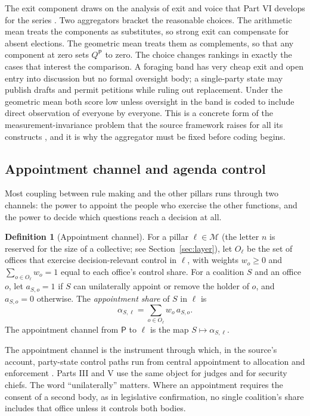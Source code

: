 \documentclass[11pt,letterpaper]{article}
\theoremstyle{definition}
\newtheorem{definition}[theorem]{Definition}
\theoremstyle{remark}
\newcommand{\pP}{\mathsf{P}}
\newcommand{\Mset}{\mathcal{M}}
\begin{document}
The exit component draws on the analysis of exit and voice that Part VI develops for the series \citep{long2026productive}. Two aggregators bracket the reasonable choices. The arithmetic mean treats the components as substitutes, so strong exit can compensate for absent elections. The geometric mean treats them as complements, so that any component at zero sets $Q^{\pP}$ to zero. The choice changes rankings in exactly the cases that interest the comparison. A foraging band has very cheap exit and open entry into discussion but no formal oversight body; a single-party state may publish drafts and permit petitions while ruling out replacement. Under the geometric mean both score low unless oversight in the band is coded to include direct observation of everyone by everyone. This is a concrete form of the measurement-invariance problem that the source framework raises for all its constructs \citep{largo2026hbs}, and it is why the aggregator must be fixed before coding begins.

\subsection{Appointment channel and agenda control}

Most coupling between rule making and the other pillars runs through two channels: the power to appoint the people who exercise the other functions, and the power to decide which questions reach a decision at all.

\begin{definition}[Appointment channel]
\label{def:political-power:appointment-channel}
For a pillar $\ell\in\Mset$ (the letter $n$ is reserved for the size of a collective; see Section~\ref{sec:layer}), let $O_\ell$ be the set of offices that exercise decision-relevant control in $\ell$, with weights $w_o\ge0$ and $\sum_{o\in O_\ell}w_o=1$ equal to each office's control share. For a coalition $S$ and an office $o$, let $a_{S,o}=1$ if $S$ can unilaterally appoint or remove the holder of $o$, and $a_{S,o}=0$ otherwise. The \emph{appointment share} of $S$ in $\ell$ is
\[
\alpha_{S,\ell}=\sum_{o\in O_\ell}w_o\,a_{S,o}.
\]
The appointment channel from $\pP$ to $\ell$ is the map $S\mapsto\alpha_{S,\ell}$.
\end{definition}

The appointment channel is the instrument through which, in the source's account, party-state control paths run from central appointment to allocation and enforcement \citep[Proposition~3]{largo2026hbs}. Parts III and V use the same object for judges and for security chiefs. The word ``unilaterally'' matters. Where an appointment requires the consent of a second body, as in legislative confirmation, no single coalition's share includes that office unless it controls both bodies.
\end{document}
